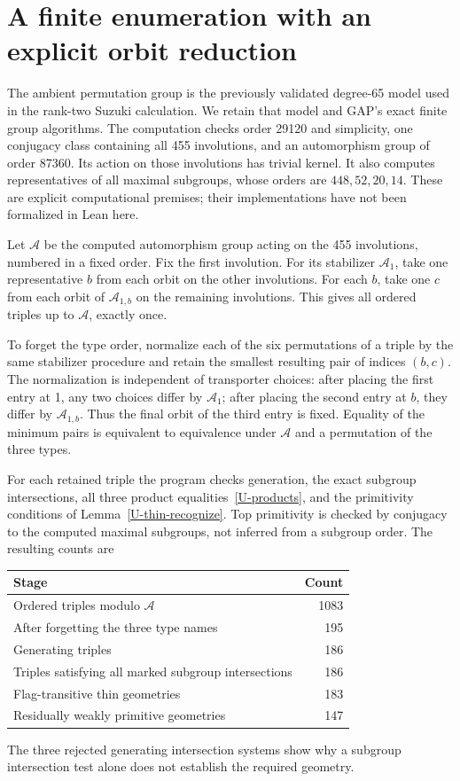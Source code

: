 \section*{A finite enumeration with an explicit orbit reduction}
The ambient permutation group is the previously validated degree-65 model
used in the rank-two Suzuki calculation. We retain that model and GAP's
exact finite group algorithms. The computation checks order 29120 and
simplicity, one conjugacy class containing all 455 involutions, and an
automorphism group of order 87360. Its action on those involutions has
trivial kernel. It also computes representatives of all maximal subgroups,
whose orders are $448,52,20,14$. These are explicit computational premises;
their implementations have not been formalized in Lean here.

Let $\mathcal A$ be the computed automorphism group acting on the 455
involutions, numbered in a fixed order. Fix the first involution. For its
stabilizer $\mathcal A_1$, take one representative $b$ from each orbit on
the other involutions. For each $b$, take one $c$ from each orbit of
$\mathcal A_{1,b}$ on the remaining involutions. This gives all ordered
triples up to $\mathcal A$, exactly once.

To forget the type order, normalize each of the six permutations of a
triple by the same stabilizer procedure and retain the smallest resulting
pair of indices $(b,c)$. The normalization is independent of transporter
choices: after placing the first entry at 1, any two choices differ by
$\mathcal A_1$; after placing the second entry at $b$, they differ by
$\mathcal A_{1,b}$. Thus the final orbit of the third entry is fixed.
Equality of the minimum pairs is equivalent to equivalence under
$\mathcal A$ and a permutation of the three types.

For each retained triple the program checks generation, the exact
subgroup intersections, all three product equalities~\eqref{U-products},
and the primitivity conditions of Lemma~\ref{U-thin-recognize}. Top primitivity
is checked by conjugacy to the computed maximal subgroups, not inferred
from a subgroup order. The resulting counts are
\begin{center}\begin{tabular}{lr}\toprule
Stage & Count\\\midrule
Ordered triples modulo $\mathcal A$ & 1083\\
After forgetting the three type names & 195\\
Generating triples & 186\\
Triples satisfying all marked subgroup intersections & 186\\
Flag-transitive thin geometries & 183\\
Residually weakly primitive geometries & 147\\\bottomrule
\end{tabular}\end{center}
The three rejected generating intersection systems show why a subgroup
intersection test alone does not establish the required geometry.

